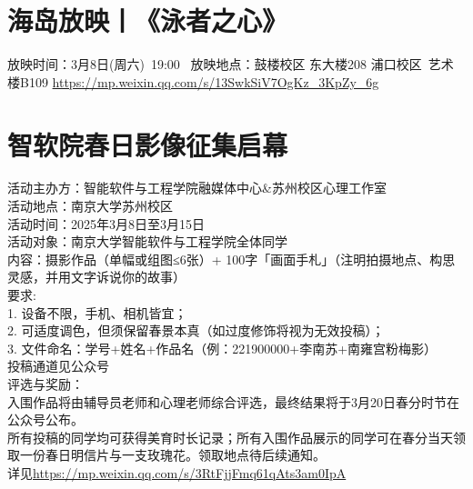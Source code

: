 \documentclass[letterpaper, 12pt]{article}
\begin{document}
\begin{multicols}{2}
\section{海岛放映丨《泳者之心》}
放映时间：3月8日(周六) 19:00 
放映地点：鼓楼校区 东大楼208
浦口校区 艺术楼B109
\url{https://mp.weixin.qq.com/s/13SwkSiV7OgKz_3KpZy_6g}

\section{智软院春日影像征集启幕}
活动主办方：智能软件与工程学院融媒体中心\&苏州校区心理工作室\\
活动地点：南京大学苏州校区\\
活动时间：2025年3月8日至3月15日\\
活动对象：南京大学智能软件与工程学院全体同学\\
内容：摄影作品（单幅或组图≤6张）+ 100字「画面手札」（注明拍摄地点、构思灵感，并用文字诉说你的故事）\\
要求:\\
1. 设备不限，手机、相机皆宜；\\
2. 可适度调色，但须保留春景本真（如过度修饰将视为无效投稿）；\\
3. 文件命名：学号+姓名+作品名（例：221900000+李南苏+南雍宫粉梅影）\\
投稿通道见公众号\\
评选与奖励：\\
入围作品将由辅导员老师和心理老师综合评选，最终结果将于3月20日春分时节在公众号公布。\\
所有投稿的同学均可获得美育时长记录；所有入围作品展示的同学可在春分当天领取一份春日明信片与一支玫瑰花。领取地点待后续通知。\\
详见\url{https://mp.weixin.qq.com/s/3RtFjjFmq61qAts3am0IpA}
\end{multicols} 
\end{document}

